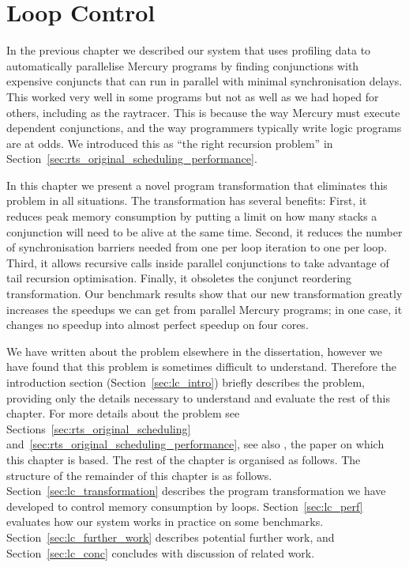 
\chapter{Loop Control}
\label{chap:lc}
\label{chap:loop_control}


In the previous chapter we described our
system that uses profiling data
to automatically parallelise Mercury programs by
finding conjunctions with expensive conjuncts
that can run in parallel with minimal synchronisation delays.
This worked very well in some programs but not as well as we had hoped for
others,
including as the raytracer.
This is because the way Mercury must execute dependent conjunctions,
and the way programmers typically write logic programs are at odds.
We introduced this as
``the right recursion problem''
in Section~\ref{sec:rts_original_scheduling_performance}.

In this chapter we present a novel program transformation that eliminates
this problem in all situations.
The transformation has several benefits:
First, it reduces peak memory consumption
by putting a limit on how many stacks
a conjunction will need to be alive at the same time.
Second,
it reduces the number of synchronisation barriers needed
from one per loop iteration to one per loop.
Third, it allows recursive calls inside parallel conjunctions to take
advantage of tail recursion optimisation.
Finally, it obsoletes the conjunct reordering transformation.
Our benchmark results show that our new transformation
greatly increases the speedups we can get from parallel Mercury programs;
in one case, it changes no speedup into almost perfect speedup on four cores.

We have written about the problem elsewhere in the dissertation,
however we have found that this problem is sometimes difficult to
understand.
Therefore
the introduction section
(Section~\ref{sec:lc_intro})
briefly describes the problem,
providing only the details necessary to understand and evaluate the rest of
this chapter.
For more details about the problem see
Sections~\ref{sec:rts_original_scheduling}
and~\ref{sec:rts_original_scheduling_performance},
see also \citet{bone:2012:loop_control}, the paper on which this chapter is
based.
The rest of the chapter is organised as follows.
The structure of the remainder of this chapter is as follows.
Section~\ref{sec:lc_transformation} describes
the program transformation we have developed
to control memory consumption by loops.
Section~\ref{sec:lc_perf} evaluates
how our system works in practice on some benchmarks.
Section~\ref{sec:lc_further_work}
describes potential further work,
and
Section~\ref{sec:lc_conc} concludes with discussion of related work.

